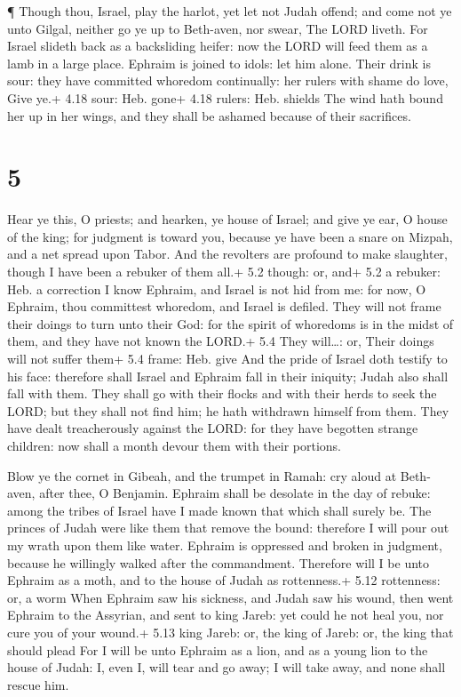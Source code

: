  ¶ Though thou, Israel, play the harlot, yet let not Judah
offend; and come not ye unto Gilgal, neither go ye up to Beth-aven, nor
swear, The LORD liveth.  For Israel slideth back as a
backsliding heifer: now the LORD will feed them as a lamb in a large
place.  Ephraim is joined to idols: let him alone.
 Their drink is sour: they have committed whoredom
continually: her rulers with shame do love, Give ye.+ 4.18 sour: Heb.
gone+ 4.18 rulers: Heb. shields  The wind hath bound her up
in her wings, and they shall be ashamed because of their sacrifices.

\hypertarget{section-4}{%
\section{5}\label{section-4}}

 Hear ye this, O priests; and hearken, ye house of Israel;
and give ye ear, O house of the king; for judgment is toward you,
because ye have been a snare on Mizpah, and a net spread upon Tabor.
 And the revolters are profound to make slaughter, though I
have been a rebuker of them all.+ 5.2 though: or, and+ 5.2 a rebuker:
Heb. a correction  I know Ephraim, and Israel is not hid
from me: for now, O Ephraim, thou committest whoredom, and Israel is
defiled.  They will not frame their doings to turn unto
their God: for the spirit of whoredoms is in the midst of them, and they
have not known the LORD.+ 5.4 They will\ldots: or, Their doings will not
suffer them+ 5.4 frame: Heb. give  And the pride of Israel
doth testify to his face: therefore shall Israel and Ephraim fall in
their iniquity; Judah also shall fall with them.  They shall
go with their flocks and with their herds to seek the LORD; but they
shall not find him; he hath withdrawn himself from them. 
They have dealt treacherously against the LORD: for they have begotten
strange children: now shall a month devour them with their portions.

 Blow ye the cornet in Gibeah, and the trumpet in Ramah: cry
aloud at Beth-aven, after thee, O Benjamin.  Ephraim shall
be desolate in the day of rebuke: among the tribes of Israel have I made
known that which shall surely be.  The princes of Judah
were like them that remove the bound: therefore I will pour out my wrath
upon them like water.  Ephraim is oppressed and broken in
judgment, because he willingly walked after the commandment.
 Therefore will I be unto Ephraim as a moth, and to the
house of Judah as rottenness.+ 5.12 rottenness: or, a worm 
When Ephraim saw his sickness, and Judah saw his wound, then went
Ephraim to the Assyrian, and sent to king Jareb: yet could he not heal
you, nor cure you of your wound.+ 5.13 king Jareb: or, the king of
Jareb: or, the king that should plead  For I will be unto
Ephraim as a lion, and as a young lion to the house of Judah: I, even I,
will tear and go away; I will take away, and none shall rescue him.


